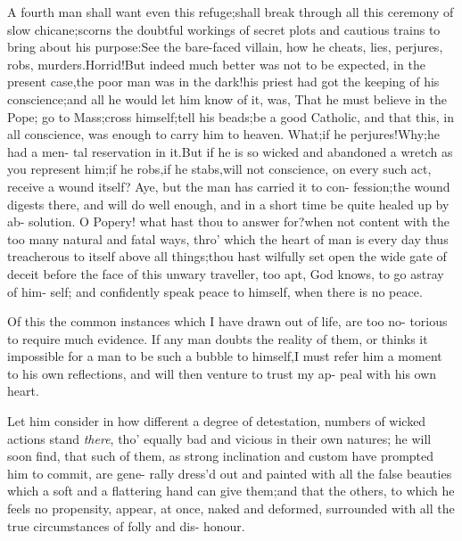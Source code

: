 \documentclass{article}
\begin{document}
\lqq A fourth man shall want even this\break
\lqq refuge;\tsk shall break through all this\break
\lqq ceremony of slow chicane;\tsk scorns\break
\lqq the doubtful workings of secret plots\break
\lqq and cautious trains to bring about his\break
\lqq purpose:\tsh See the bare-faced villain,\break
\lqq how he cheats, lies, perjures, robs,\break
\lqq murders.\tsh Horrid!\tsh But indeed\break
\lqq much better was not to be expected,\break
\lqq in the present case,\tsk the poor man\break
\lqq was in the dark!\tsk his priest had got
\lqq the keeping of his conscience;\tsh and\break
\lqq all he would let him know of it, was,\break
\lqq That he must believe in the Pope;\tsk\break
\lqq go to Mass;\tsk cross himself;\tsk tell his\break
\lqq beads;\tsh be a good Catholic, and\break
\lqq that this, in all conscience, was enough\break
\lqq to carry him to heaven.  What;\tsk if\break
\lqq he perjures!\tsk Why;\tsk he had a men-\break
\lqq tal reservation in it.\tsk But if he is so\break
\lqq wicked and abandoned a wretch as\break
\lqq you represent him;\tsk if he robs,\tsk if\break
\lqq he stabs,\tsk will not conscience, on every 
\lqq such act, receive a wound itself? Aye,\break
\lqq \tsk but the man has carried it to con-\break
\lqq fession;\tsk the wound digests there,\break
\lqq and will do well enough, and in a\break
\lqq short time be quite healed up by ab-\break
\lqq solution. O Popery! what hast thou\break
\lqq to answer for?\tsk when not content\break
\lqq with the too many natural and fatal\break
\lqq ways, thro’ which the heart of man is
\lqq every day thus treacherous to itself\break
\lqq above all things;\tsk thou hast wilfully\break
\lqq set open the wide gate of deceit before\break
\lqq the face of this unwary traveller, too\break
\lqq apt, God knows, to go astray of him-\break
\lqq self; and confidently speak peace to\break
\lqq himself, when there is no peace.

\lqq Of this the common instances which\break
\lqq I have drawn out of life, are too no-\break
\lqq torious to require much evidence. If\break
\lqq any man doubts the reality of them,\break
\lqq or thinks it impossible for a man to be\break
\lqq such a bubble to himself,\tsk I must refer\break
\lqq him a moment to his own reflections,\break
\lqq and will then venture to trust my ap-\break
\lqq peal with his own heart.  

\lqq Let him consider in how different\break
\lqq a degree of detestation, numbers of\break
\lqq wicked actions stand \textit{there}, tho’ equally
\lqq bad and vicious in their own natures;\break
\lqq \tsk he will soon find, that such of them,\break
\lqq as strong inclination and custom have\break
\lqq prompted him to commit, are gene-\break
\lqq rally dress’d out and painted with all\break
\lqq the false beauties which a soft and a\break
\lqq flattering hand can give them;\tsk and\break
\lqq that the others, to which he feels no\break
\lqq propensity, appear, at once, naked and\break
\lqq deformed, surrounded with all the\break
\lqq true circumstances of folly and dis-\break
\lqq honour.
\end{document}
